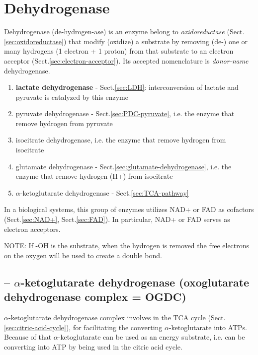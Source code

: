 \section{Dehydrogenase}
\label{sec:dehydrogenase}

Dehydrogenase (de-hydrogen-ase) is an enzyme belong to {\it oxidoreductase}
(Sect.\ref{sec:oxidoreductase}) that modify (oxidize) a substrate by removing
(de-) one or many hydrogens (1 electron + 1 proton) from that substrate to an
electron acceptor (Sect.\ref{sec:electron-acceptor}). Its accepted nomenclature
is {\it donor-name} dehydrogenase.

\begin{enumerate}
  \item  {\bf lactate dehydrogenase} - Sect.\ref{sec:LDH}: 
  interconversion of lactate and pyruvate is catalyzed by this enzyme
  
  \item pyruvate dehydrogenase - Sect.\ref{sec:PDC-pyruvate}, i.e. the enzyme
  that remove hydrogen from pyruvate
  
  \item isocitrate dehydrogenase, i.e. the enzyme that remove hydrogen from isocitrate
  
  \item glutamate dehydrogenase - Sect.\ref{sec:glutamate-dehydrogenase}, i.e.
  the enzyme that remove hydrogen (H+) from isocitrate
  
  \item $\alpha$-ketoglutarate dehydrogenase - Sect.\ref{sec:TCA-pathway}
\end{enumerate}

In a biological systems, this group of enzymes utilizes NAD+ or FAD as
cofactors (Sect.\ref{sec:NAD+}, Sect.\ref{sec:FAD}).
In particular, NAD+ or FAD serves as electron acceptors.


NOTE: If -OH is the substrate, when the hydrogen is removed the free electrons
on the oxygen will be used to create a double bond. 

\subsection{-- $\alpha$-ketoglutarate dehydrogenase (oxoglutarate dehydrogenase complex = OGDC)}
\label{sec:ketoglutarate}
\label{sec:alpha-ketoglutarate-dehydrogenase complex}
\label{sec:oxoglutarate-dehydrogenase-complex-}
\label{sec:OGDC-oxoglutarate}

$\alpha$-ketoglutarate dehydrogenase complex involves in the TCA cycle
(Sect.\ref{sec:citric-acid-cycle}), for facilitating the converting 
$\alpha$-ketoglutarate into ATPs. Because of that $\alpha$-ketoglutarate can be
used as an energy substrate, i.e.
can be converting into ATP by being used in the citric acid cycle.


